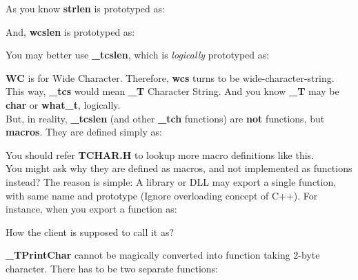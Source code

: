 	As you know \textbf{strlen} is prototyped as:
	
	
	And, \textbf{wcslen} is prototyped as:
	
	
	You may better use \textbf{\_tcslen}, which is \textit{logically} prototyped as:
	
	
	\textbf{WC} is for Wide Character. Therefore, \textbf{wcs} turns to be wide-character-string. This way, \textbf{\_tcs} would mean \textbf{\_T} Character String. And you know \textbf{\_T} may be \textbf{char} or \textbf{what\_t}, logically.\\
	
	
	But, in reality, \textbf{\_tcslen} (and other \textbf{\_tch } functions) are \textbf{not} functions, but \textbf{macros}. They are defined simply as:
	
	
	You should refer \textbf{TCHAR.H} to lookup more macro definitions like this.\\
	
	You might ask why they are defined as macros, and not implemented as functions instead? The reason is simple: A library or DLL may export a single function, with same name and prototype (Ignore overloading concept of C++). For instance, when you export a function as:\\
	
	
	How the client is supposed to call it as?\\
	
	
	\textbf{\_TPrintChar} cannot be magically converted into function taking 2-byte character. There has to be two separate functions:\\
	
	
